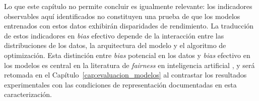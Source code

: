 Lo que este capítulo no permite concluir es igualmente relevante: los indicadores observables aquí identificados no constituyen una prueba de que los modelos entrenados con estos datos exhibirán disparidades de rendimiento. La traducción de estos indicadores en \textit{bias} efectivo depende de la interacción entre las distribuciones de los datos, la arquitectura del modelo y el algoritmo de optimización. Esta distinción entre \textit{bias} potencial en los datos y \textit{bias} efectivo en los modelos es central en la literatura de \textit{fairness} en inteligencia artificial \parencite{mehrabi2021survey}, y será retomada en el Capítulo~\ref{cap:evaluacion_modelos} al contrastar los resultados experimentales con las condiciones de representación documentadas en esta caracterización.
